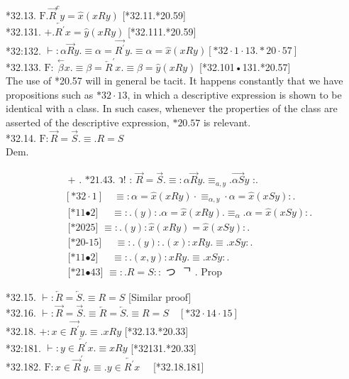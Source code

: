\documentclass[10pt]{article}
\begin{document}
*32.13. $\mathrm{F} . \vec{R}^{c} y=\widehat{x}(x R y)$ [*32.11.*20.59]\\
*32.131. $+. \overleftarrow{R^{\prime}} x=\hat{y}(x R y)$ [*32.111.*20.59]\\
*32:132. $\vdash: \alpha \vec{R} y . \equiv \alpha=\overrightarrow{R^{\prime}} y . \equiv \alpha=\hat{x}(x R y)[* 32 \cdot 1 \cdot 13 . * 20 \cdot 57]$\\
*32.133. $\mathrm{F}: ~ \stackrel{\leftarrow}{\beta} x . \equiv \beta=\overleftarrow{R}^{\prime} x . \equiv \beta=\hat{y}(x R y)$ [*32.101•131.*20.57]\\
The use of *20.57 will in general be tacit. It happens constantly that we have propositions such as $* 32 \cdot 13$, in which a descriptive expression is shown to be identical with a class. In such cases, whenever the properties of the class are asserted of the descriptive expression, $* 20.57$ is relevant.\\
*32.14. $\mathrm{F}: \vec{R}=\vec{S} . \equiv . R=S$\\
Dem.

$$
\begin{aligned}
& \text { + . *21.43. ว! : } \vec{R}=\vec{S} . \equiv: \alpha \vec{R} y . \equiv_{a, y} . \overrightarrow{\alpha S} y \text { :. } \\
& {[* 32 \cdot 1] \quad \equiv: \alpha=\hat{x}(x R y) \cdot \equiv_{\alpha, y} \cdot \alpha=\hat{x}(x S y): .} \\
& \text { [*11•2] } \quad \equiv: .(y): . \alpha=\widehat{x}(x R y) . \equiv_{\alpha} . \alpha=\widehat{x}(x S y): . \\
& \text { [*2025] } \equiv: .(y): \hat{x}(x R y)=\hat{x}(x S y): \text {. } \\
& \text { [*20-15] } \quad \equiv: .(y): .(x): x R y . \equiv . x S y: . \\
& \text { [*11•2] } \quad \equiv: .(x, y): x R y . \equiv . x S y: . \\
& \text { [*21•43] } \equiv: . R=S:: \text { つ } \text { ᄀ . Prop }
\end{aligned}
$$

*32.15. $\vdash: \overleftarrow{R}=\overleftarrow{S} . \equiv R=S$ [Similar proof]\\
*32.16. $\vdash: \vec{R}=\vec{S} . \equiv \overleftarrow{R}=\overleftarrow{S} . \equiv R=S \quad[* 32 \cdot 14 \cdot 15]$\\
*32.18. $+: x \in \overrightarrow{R^{\prime}} y . \equiv . x R y$ [*32.13.*20.33]\\
*32:181. $\vdash: y \in \overleftarrow{R^{\prime}} x . \equiv x R y$ [*32131.*20.33]\\
*32.182. $\mathrm{F}: x \in \vec{R}^{\prime} y . \equiv . y \in \overleftarrow{R^{\prime}} x \quad$ [*32.18.181]
\end{document}
